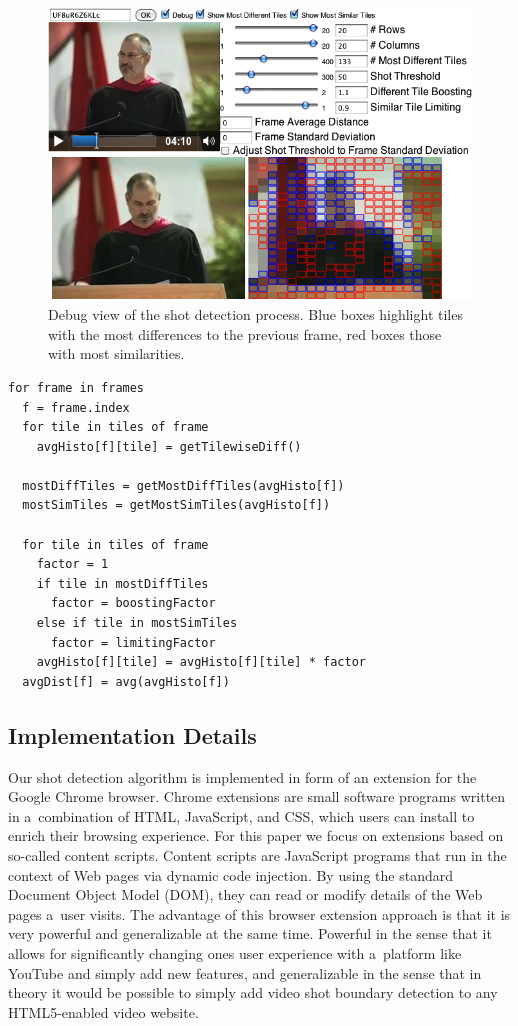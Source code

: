 \begin{figure}
\begin{center}
   \includegraphics[width=1.0\linewidth]{./algorithm.png}
\end{center}
   \caption{Debug view of the shot detection process. Blue boxes highlight tiles with the most differences to the previous frame, red boxes those with most similarities.}
\label{fig:algorithm}
\end{figure}

\begin{lstlisting}[caption=Pseudocode of shot detection algorithm., label=code:algorithm, float]
for frame in frames
  f = frame.index  
  for tile in tiles of frame      
    avgHisto[f][tile] = getTilewiseDiff()
 
  mostDiffTiles = getMostDiffTiles(avgHisto[f])
  mostSimTiles = getMostSimTiles(avgHisto[f])
 
  for tile in tiles of frame    
    factor = 1  
    if tile in mostDiffTiles
      factor = boostingFactor
    else if tile in mostSimTiles
      factor = limitingFactor
    avgHisto[f][tile] = avgHisto[f][tile] * factor
  avgDist[f] = avg(avgHisto[f])
\end{lstlisting}

\subsection{Implementation Details} \label{sec:implementation}
Our shot detection algorithm is implemented in form of an extension for the Google Chrome browser. Chrome extensions are small software programs written in a~combination of HTML, JavaScript, and CSS, which users can install to enrich their browsing experience. For this paper we focus on extensions based on so-called content scripts. Content scripts are JavaScript programs that run in the context of Web pages via dynamic code injection. By using the standard Document Object Model (DOM), they can read or modify details of the Web pages a~user visits. The advantage of this browser extension approach is that it is very powerful and generalizable at the same time. Powerful in the sense that it allows for significantly changing ones user experience with a~platform like YouTube and simply add new features, and generalizable in the sense that in theory it would be possible to simply add video shot boundary detection to any HTML5-enabled video website.

